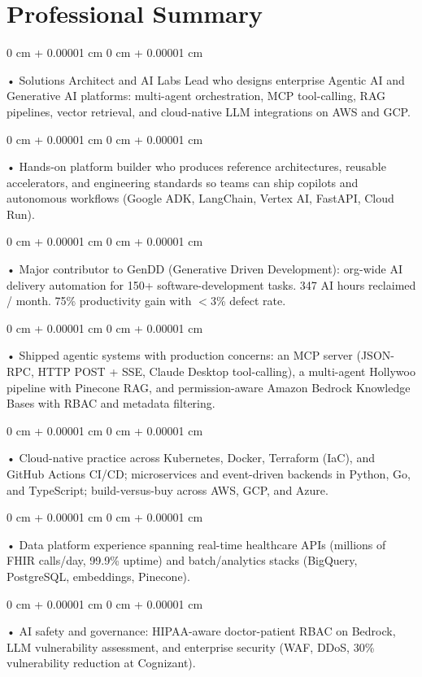 \documentclass[10pt, letterpaper]{article}
\newenvironment{onecolentry}{
    \begin{adjustwidth}{
        0 cm + 0.00001 cm
    }{
        0 cm + 0.00001 cm
    }
}{
    \end{adjustwidth}
} %
\begin{document}
    \section{Professional Summary}
        \vspace{2 pt }
        \begin{onecolentry}
            • Solutions Architect and AI Labs Lead who designs enterprise Agentic AI and Generative AI platforms: multi-agent orchestration, MCP tool-calling, RAG pipelines, vector retrieval, and cloud-native LLM integrations on AWS and GCP.
        \end{onecolentry}
        \begin{onecolentry}
            • Hands-on platform builder who produces reference architectures, reusable accelerators, and engineering standards so teams can ship copilots and autonomous workflows (Google ADK, LangChain, Vertex AI, FastAPI, Cloud Run).
        \end{onecolentry}
        \begin{onecolentry}
            • Major contributor to GenDD (Generative Driven Development): org-wide AI delivery automation for 150+ software-development tasks. 347 AI hours reclaimed / month. 75\% productivity gain with $<$3\% defect rate.
        \end{onecolentry}
        \begin{onecolentry}
            • Shipped agentic systems with production concerns: an MCP server (JSON-RPC, HTTP POST + SSE, Claude Desktop tool-calling), a multi-agent Hollywoo pipeline with Pinecone RAG, and permission-aware Amazon Bedrock Knowledge Bases with RBAC and metadata filtering.
        \end{onecolentry}
        \begin{onecolentry}
            • Cloud-native practice across Kubernetes, Docker, Terraform (IaC), and GitHub Actions CI/CD; microservices and event-driven backends in Python, Go, and TypeScript; build-versus-buy across AWS, GCP, and Azure.
        \end{onecolentry}
        \begin{onecolentry}
            • Data platform experience spanning real-time healthcare APIs (millions of FHIR calls/day, 99.9\% uptime) and batch/analytics stacks (BigQuery, PostgreSQL, embeddings, Pinecone).
        \end{onecolentry}
        \begin{onecolentry}
            • AI safety and governance: HIPAA-aware doctor-patient RBAC on Bedrock, LLM vulnerability assessment, and enterprise security (WAF, DDoS, 30\% vulnerability reduction at Cognizant).
        \end{onecolentry}
\end{document}
